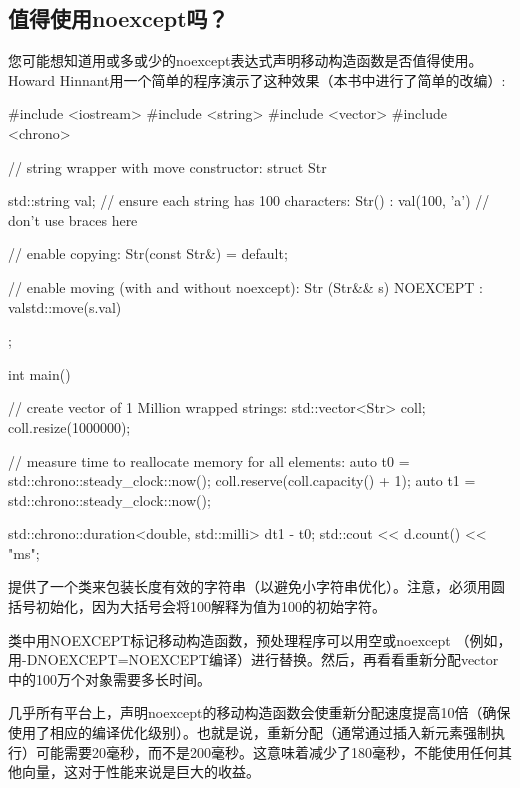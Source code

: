 \subsection{值得使用noexcept吗？}

您可能想知道用或多或少的noexcept表达式声明移动构造函数是否值得使用。Howard Hinnant用一个简单的程序演示了这种效果（本书中进行了简单的改编）:

\begin{cppcode}
#include <iostream>
#include <string>
#include <vector>
#include <chrono>

// string wrapper with move constructor:
struct Str
{
	std::string val;
	// ensure each string has 100 characters:
	Str()
	: val(100, 'a') { // don’t use braces here
	}

	// enable copying:
	Str(const Str&) = default;

	// enable moving (with and without noexcept):
	Str (Str&& s) NOEXCEPT
	: val{std::move(s.val)} {
	}
};

int main()
{
	// create vector of 1 Million wrapped strings:
	std::vector<Str> coll;
	coll.resize(1000000);

	// measure time to reallocate memory for all elements:
	auto t0 = std::chrono::steady_clock::now();
	coll.reserve(coll.capacity() + 1);
	auto t1 = std::chrono::steady_clock::now();

	std::chrono::duration<double, std::milli> d{t1 - t0};
	std::cout << d.count() << "ms\n";
}
\end{cppcode}

提供了一个类来包装长度有效的字符串（以避免小字符串优化）。注意，必须用圆括号初始化，因为大括号会将100解释为值为100的初始字符。

类中用NOEXCEPT标记移动构造函数，预处理程序可以用空或noexcept （例如，用-DNOEXCEPT=NOEXCEPT编译）进行替换。然后，再看看重新分配vector中的100万个对象需要多长时间。

几乎所有平台上，声明noexcept的移动构造函数会使重新分配速度提高10倍（确保使用了相应的编译优化级别）。也就是说，重新分配（通常通过插入新元素强制执行）可能需要20毫秒，而不是200毫秒。这意味着减少了180毫秒，不能使用任何其他向量，这对于性能来说是巨大的收益。





